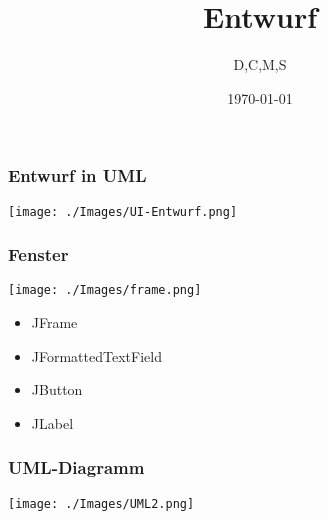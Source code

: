 \documentclass{beamer}
\author{D,C,M,S}
\title{Entwurf}
\date{\today}
\begin{document}

\begin{frame}
	\frametitle{Entwurf in UML}
	\begin{center}
		\texttt{[image: ./Images/UI-Entwurf.png]}
	\end{center}
\end{frame}

\begin{frame}
	\frametitle{Fenster}
	\begin{minipage}{0.49\linewidth}
		\texttt{[image: ./Images/frame.png]}
	\end{minipage}
		\hfill
		\begin{minipage}{0.5\linewidth}
			\begin{itemize}
				\item JFrame
				\item JFormattedTextField
				\item JButton
				\item JLabel
			\end{itemize}
	\end{minipage}	
\end{frame}

\begin{frame}
	\frametitle{UML-Diagramm}
	\begin{center}
		\texttt{[image: ./Images/UML2.png]}
	\end{center}
\end{frame}
\end{document}

